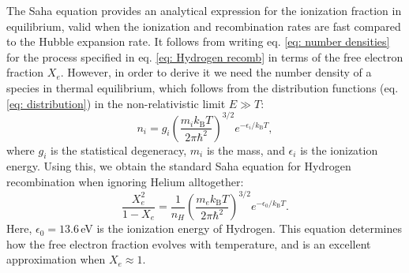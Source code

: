 \documentclass{aa}
\numberwithin{equation}{section}
\numberwithin{table}{section}
\numberwithin{figure}{section}
\begin{document}

The Saha equation provides an analytical expression for the ionization fraction in equilibrium, valid when the ionization and recombination rates are fast compared to the Hubble expansion rate. It follows from writing eq. \eqref{eq: number densities} for the process specified in eq. \eqref{eq: Hydrogen recomb} in terms of the free electron fraction $X_e$. However, in order to derive it we need the number density of a species in thermal equilibrium, which follows from the distribution functions (eq. \eqref{eq: distribution}) in the non-relativistic limit $E\gg T$:
\begin{equation}
n_i = g_i \left( \frac{m_i k_\text{B} T}{2\pi \hbar^2} \right)^{3/2} e^{-\epsilon_i / k_\text{B} T},
\end{equation}
where $g_i$ is the statistical degeneracy, $m_i$ is the mass, and $\epsilon_i$ is the ionization energy. Using this, we obtain the standard Saha equation for Hydrogen recombination when ignoring Helium alltogether:
\begin{equation}
\frac{X_e^2}{1 - X_e} = \frac{1}{n_H} \left( \frac{m_e k_\text{B} T}{2\pi \hbar^2} \right)^{3/2} e^{-\epsilon_0 / k_\text{B} T}. \label{eq: Saha}
\end{equation}
Here, $\epsilon_0 = 13.6\,$eV is the ionization energy of Hydrogen. This equation determines how the free electron fraction evolves with temperature, and is an excellent approximation when $X_e\approx1$.
\end{document}
